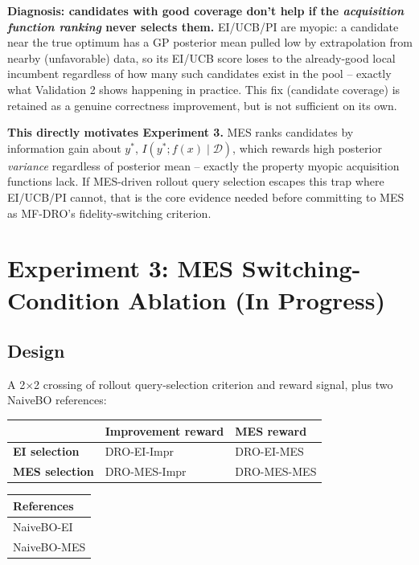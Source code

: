 \documentclass[11pt]{article}
\begin{document}
\textbf{Diagnosis: candidates with good coverage don't help if the
\emph{acquisition function ranking} never selects them.} EI/UCB/PI are
myopic: a candidate near the true optimum has a GP posterior mean pulled low by
extrapolation from nearby (unfavorable) data, so its EI/UCB score loses to the
already-good local incumbent regardless of how many such candidates exist in
the pool -- exactly what Validation 2 shows happening in practice. This fix
(candidate coverage) is retained as a genuine correctness improvement, but is
not sufficient on its own.

\textbf{This directly motivates Experiment 3.} MES ranks candidates by
information gain about $y^*$, $I(y^*; f(x) \mid \mathcal{D})$, which rewards
high posterior \emph{variance} regardless of posterior mean -- exactly the
property myopic acquisition functions lack. If MES-driven rollout query
selection escapes this trap where EI/UCB/PI cannot, that is the core evidence
needed before committing to MES as MF-DRO's fidelity-switching criterion.

\FloatBarrier
\section{Experiment 3: MES Switching-Condition Ablation (In Progress)}

\subsection{Design}

A 2$\times$2 crossing of rollout query-selection criterion and reward signal,
plus two NaiveBO references:

\begin{center}
\begin{tabular}{lll}
\toprule
& \textbf{Improvement reward} & \textbf{MES reward} \\
\midrule
\textbf{EI selection}  & DRO-EI-Impr & DRO-EI-MES \\
\textbf{MES selection} & DRO-MES-Impr & DRO-MES-MES \\
\bottomrule
\end{tabular}
\qquad
\begin{tabular}{l}
\toprule
\textbf{References} \\
\midrule
NaiveBO-EI \\
NaiveBO-MES \\
\bottomrule
\end{tabular}
\end{center}
\end{document}
